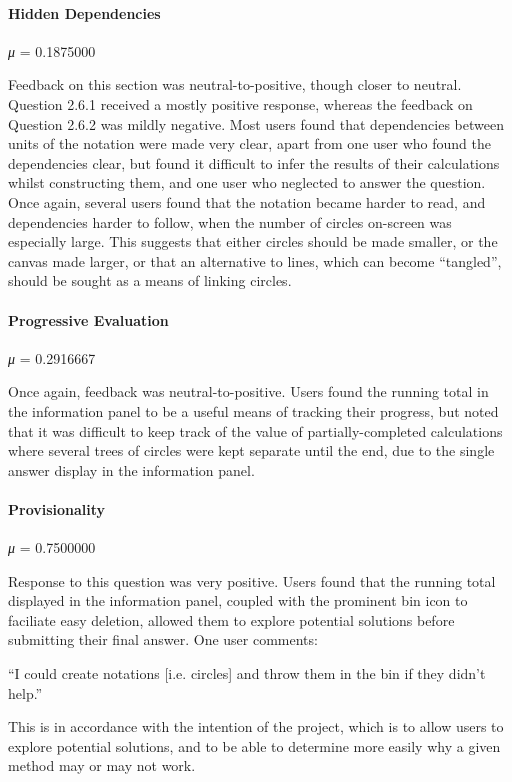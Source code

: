\documentclass[12pt,twoside,notitlepage,xetex]{report}
\begin{document}
{\paragraph{Hidden Dependencies}\hfill

\emph{μ} = 0.1875000

Feedback on this section was neutral-to-positive, though closer to neutral.  Question 2.6.1 received a mostly positive response, whereas the feedback on Question 2.6.2 was mildly negative.  Most users found that dependencies between units of the notation were made very clear, apart from one user who found the dependencies clear, but found it difficult to infer the results of their calculations whilst constructing them, and one user who neglected to answer the question.  Once again, several users found that the notation became harder to read, and dependencies harder to follow, when the number of circles on-screen was especially large.  This suggests that either circles should be made smaller, or the canvas made larger, or that an alternative to lines, which can become ``tangled'', should be sought as a means of linking circles.

\paragraph{Progressive Evaluation}\hfill

\emph{μ} = 0.2916667

Once again, feedback was neutral-to-positive.  Users found the running total in the information panel to be a useful means of tracking their progress, but noted that it was difficult to keep track of the value of partially-completed calculations where several trees of circles were kept separate until the end, due to the single answer display in the information panel.

\paragraph{Provisionality}\hfill

\emph{μ} = 0.7500000

Response to this question was very positive.  Users found that the running total displayed in the information panel, coupled with the prominent bin icon to faciliate easy deletion, allowed them to explore potential solutions before submitting their final answer.  One user comments:
\begin{center}
\parbox[c]{\textwidth-2cm}{
\small
``I could create notations [i.e. circles] and throw them in the bin if they didn't help.''
}
\end{center}
This is in accordance with the intention of the project, which is to allow users to explore potential solutions, and to be able to determine more easily why a given method may or may not work.

}
\end{document}
